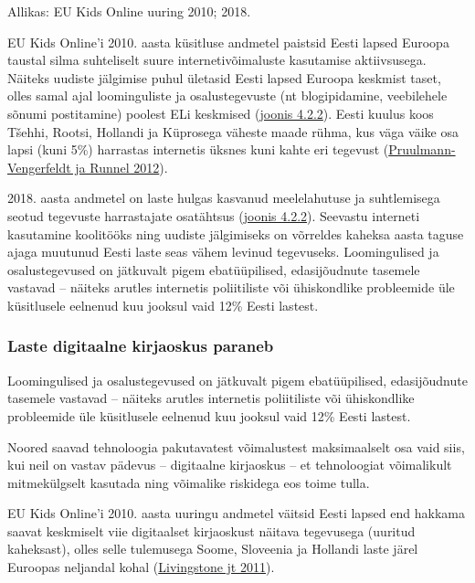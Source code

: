 \documentclass[estonian,]{article}
\begin{document}
\begin{imgsource}
{Allikas:} EU Kids Online uuring 2010; 2018.
\end{imgsource}

EU Kids Online'i 2010. aasta küsitluse andmetel paistsid Eesti lapsed Euroopa taustal silma suhteliselt suure internetivõimaluste kasutamise aktiivsusega. Näiteks uudiste jälgimise puhul ületasid Eesti lapsed Euroopa keskmist taset, olles samal ajal loominguliste ja osalustegevuste (nt blogipidamine, veebilehele sõnumi postitamine) poolest ELi keskmised (\protect\hyperlink{figure422}{joonis 4.2.2}). Eesti kuulus koos Tšehhi, Rootsi, Hollandi ja Küprosega väheste maade rühma, kus väga väike osa lapsi (kuni 5\%) harrastas internetis üksnes kuni kahte eri tegevust (\protect\hyperlink{Pruulmann-Vengerfeldt2012}{Pruulmann-Vengerfeldt ja Runnel 2012}).

2018. aasta andmetel on laste hulgas kasvanud meelelahutuse ja suhtlemisega seotud tegevuste harrastajate osatähtsus (\protect\hyperlink{figure422}{joonis 4.2.2}). Seevastu interneti kasutamine koolitööks ning uudiste jälgimiseks on võrreldes kaheksa aasta taguse ajaga muutunud Eesti laste seas vähem levinud tegevuseks. Loomingulised ja osalustegevused on jätkuvalt pigem ebatüüpilised, edasijõudnute tasemele vastavad -- näiteks arutles internetis poliitiliste või ühiskondlike probleemide üle küsitlusele eelnenud kuu jooksul vaid 12\% Eesti lastest.

\hypertarget{laste-digitaalne-kirjaoskus-paraneb}{%
\subsubsection*{Laste digitaalne kirjaoskus paraneb}\label{laste-digitaalne-kirjaoskus-paraneb}}

\begin{blockquote-right}
Loomingulised ja osalustegevused on jätkuvalt pigem ebatüüpilised,
edasijõudnute tasemele vastavad -- näiteks arutles internetis
poliitiliste või ühiskondlike probleemide üle küsitlusele eelnenud kuu
jooksul vaid 12\% Eesti lastest.
\end{blockquote-right}

Noored saavad tehnoloogia pakutavatest võimalustest maksimaalselt osa vaid siis, kui neil on vastav pädevus -- digitaalne kirjaoskus -- et tehnoloogiat võimalikult mitmekülgselt kasutada ning võimalike riskidega eos toime tulla.

EU Kids Online'i 2010. aasta uuringu andmetel väitsid Eesti lapsed end hakkama saavat keskmiselt viie digitaalset kirjaoskust näitava tegevusega (uuritud kaheksast), olles selle tulemusega Soome, Sloveenia ja Hollandi laste järel Euroopas neljandal kohal (\protect\hyperlink{Livingstone2011}{Livingstone jt 2011}).
\end{document}
